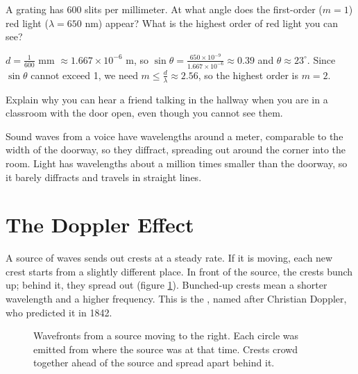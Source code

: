 \begin{Exercise}[title={A Grating}, label=wv_grating]
A grating has 600 slits per millimeter. At what angle does the first-order ($m = 1$) red light ($\lambda = 650$ nm)
appear? What is the highest order of red light you can see?
\end{Exercise}
\begin{Answer}[ref=wv_grating]
$d = \frac{1}{600}$ mm $\approx 1.667 \times 10^{-6}$ m, so $\sin\theta = \frac{650 \times 10^{-9}}{1.667 \times 10^{-6}} \approx 0.39$
and $\theta \approx 23^\circ$. Since $\sin\theta$ cannot exceed 1, we need $m \leq \frac{d}{\lambda} \approx 2.56$, so the
highest order is $m = 2$.
\end{Answer}

\begin{Exercise}[title={Around the Corner}, label=wv_corner]
Explain why you can hear a friend talking in the hallway when you are in a classroom with the door open, even though
you cannot see them.
\end{Exercise}
\begin{Answer}[ref=wv_corner]
Sound waves from a voice have wavelengths around a meter, comparable to the width of the doorway, so they diffract,
spreading out around the corner into the room. Light has wavelengths about a million times smaller than the doorway,
so it barely diffracts and travels in straight lines.
\end{Answer}

\section{The Doppler Effect}
A source of waves sends out crests at a steady rate. If it is moving, each new crest starts from a slightly different
place. In front of the source, the crests bunch up; behind it, they spread out (figure \ref{fig:doppler}). Bunched-up
crests mean a shorter wavelength and a higher frequency. This is the , named after Christian
Doppler, who predicted it in 1842.

\begin{figure}[H]
\centering
{}
\caption{Wavefronts from a source moving to the right. Each circle was emitted from where the source was at that time.
Crests crowd together ahead of the source and spread apart behind it.}
\label{fig:doppler}
\end{figure}

